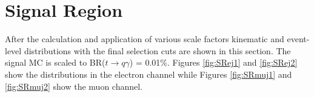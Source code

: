 %


\section{Signal Region}

After the calculation and application of various scale factors kinematic and event-level distributions with the final selection cuts are shown in this section.  The signal MC is scaled to BR($t\rightarrow q\gamma$) = 0.01\%.  Figures \ref{fig:SRej1} and \ref{fig:SRej2} show the distributions in the electron channel while Figures \ref{fig:SRmuj1} and \ref{fig:SRmuj2} show the muon channel.  %

